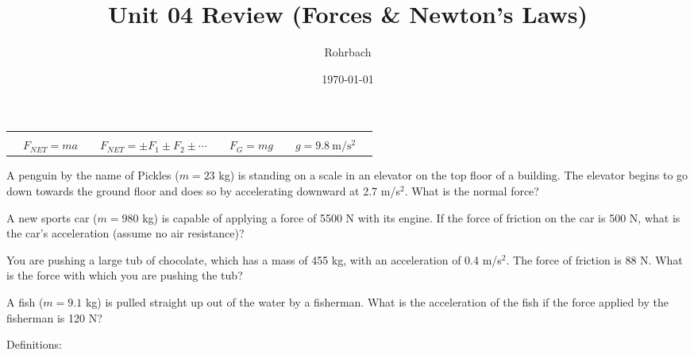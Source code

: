 \documentclass[10pt]{exam}
\title{Unit 04 Review (Forces \& Newton's Laws)}
\author{Rohrbach}
\date{\today}
\newcommand{\printeqs}{
  \begin{center}
    \begin{tabular}{|*9c|}
      \hline 
      &&&&&&&&\\
      &
      $F_{NET}=ma$ &&
      $F_{NET}=\pm F_1 \pm F_2 \pm \cdots$ &&
      $F_G=mg$ &&
      $g=\SI{9.8}{\meter\per\second^2}$ &
      \\
      \hline
    \end{tabular}
  \end{center}
}
\begin{document}
\maketitle

\printeqs

\begin{questions}

\question
  A penguin by the name of Pickles ($m=23$ kg) is standing on a scale in an elevator on the top floor of a building.  The elevator begins to go down towards the ground floor and does so by accelerating downward at 2.7 m/s$^2$.  What is the normal force?
  \vs

\question
  A new sports car ($m=980$ kg) is capable of applying a force of 5500 N with its engine.  If the force of friction on the car is 500 N, what is the car's acceleration (assume no air resistance)? 
  \vs

\question
  You are pushing a large tub of chocolate, which has a mass of 455 kg, with an acceleration of 0.4 m/s$^2$.  The force of friction is 88 N.  What is the force with which you are pushing the tub?
  \vs

\question
  A fish ($m=9.1$ kg) is pulled straight up out of the water by a fisherman.  What is the acceleration of the fish if the force applied by the fisherman is 120 N?
  \vs


\pagebreak

\question
  Definitions:
  
\end{questions}
\end{document}
